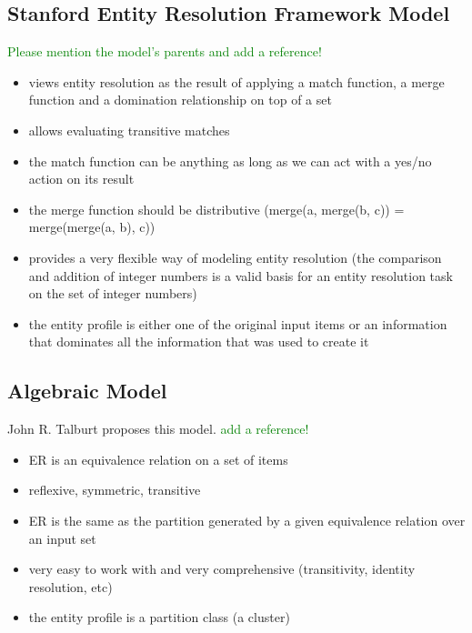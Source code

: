 \documentclass[11pt]{article}
\begin{document}
    \subsection[serf]{Stanford Entity Resolution Framework Model}\label{subsec:serf}

    \textcolor{green}{Please mention the model's parents and add a reference!}
    \begin{itemize}
        \item views entity resolution as the result of applying a match function, a merge function and a domination relationship on top of a set
        \item allows evaluating transitive matches
        \item the match function can be anything as long as we can act with a yes/no action on its result
        \item the merge function should be distributive (merge(a, merge(b, c)) = merge(merge(a, b), c))
        \item provides a very flexible way of modeling entity resolution (the comparison and addition of integer numbers is a valid basis for an entity resolution task on the set of integer numbers)
        \item the entity profile is either one of the original input items or an information that dominates all the information that was used to create it
    \end{itemize}

    \subsection[algebraic]{Algebraic Model}\label{subsec:algebraic}

    John R. Talburt proposes this model. 
    \textcolor{green}{add a reference!}
    \begin{itemize}
        \item ER is an equivalence relation on a set of items
        \item reflexive, symmetric, transitive
        \item ER is the same as the partition generated by a given equivalence relation over an input set
        \item very easy to work with and very comprehensive (transitivity, identity resolution, etc)
        \item the entity profile is a partition class (a cluster)
    \end{itemize}
\end{document}
